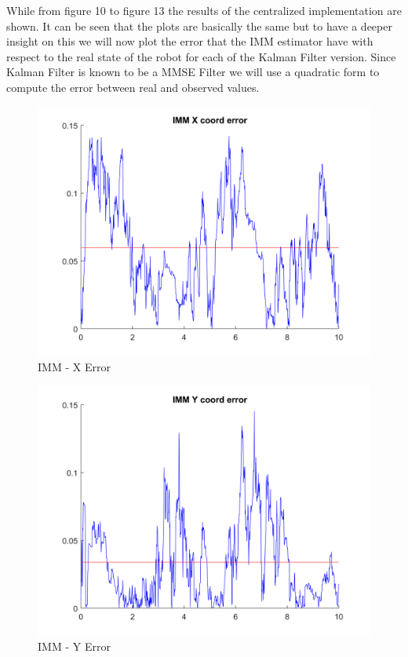 \documentclass[conference]{IEEEtran}
\begin{document}
\bigskip \bigskip \bigskip \bigskip \bigskip \bigskip \bigskip \bigskip \bigskip \bigskip \bigskip \bigskip \bigskip \bigskip \bigskip \bigskip \bigskip \bigskip \bigskip \bigskip \bigskip \bigskip \bigskip \bigskip \bigskip \bigskip \bigskip \bigskip
 While from figure 10 to figure 13 the results of the centralized implementation are shown. It can be seen that the plots are basically the same but to have a deeper insight on this we will now plot the error that the IMM estimator have with respect to the real state of the robot for each of the Kalman Filter version. Since Kalman Filter is known to be a MMSE Filter we will use a quadratic form to compute the error between real and observed values.

\begin{figure}[H]
 \includegraphics[width=\linewidth]{dwg/IMM-x-error.png}
  \caption{IMM - X Error}
 
\end{figure}

\begin{figure}[H]
 \includegraphics[width=\linewidth]{dwg/IMM-y-error.png}
  \caption{IMM - Y Error}
 
\end{figure}
\end{document}
